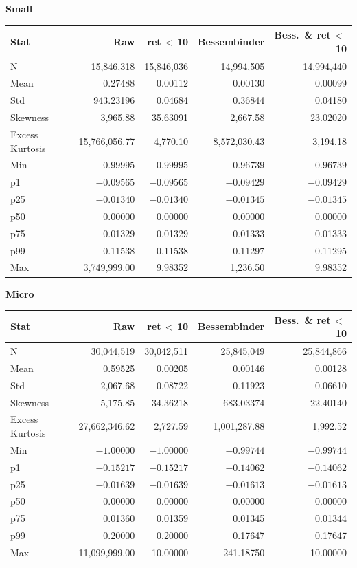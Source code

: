 \documentclass[10pt]{article}
\begin{document}
\begin{center}
\vspace{1.1em}
\textbf{Small}\\[2pt]
\begin{tabular}{l r r r r}
\toprule
Stat & {Raw} & {ret\,$<$\,10} & {Bessembinder} & {Bess.\ \& ret\,$<$\,10} \\
\midrule
N & 15,846,318 & 15,846,036 & 14,994,505 & 14,994,440 \\
Mean & 0.27488 & 0.00112 & 0.00130 & 0.00099 \\
Std & 943.23196 & 0.04684 & 0.36844 & 0.04180 \\
Skewness & 3,965.88 & 35.63091 & 2,667.58 & 23.02020 \\
Excess Kurtosis & 15,766,056.77 & 4,770.10 & 8,572,030.43 & 3,194.18 \\
Min & $-0.99995$ & $-0.99995$ & $-0.96739$ & $-0.96739$ \\
p1 & $-0.09565$ & $-0.09565$ & $-0.09429$ & $-0.09429$ \\
p25 & $-0.01340$ & $-0.01340$ & $-0.01345$ & $-0.01345$ \\
p50 & 0.00000 & 0.00000 & 0.00000 & 0.00000 \\
p75 & 0.01329 & 0.01329 & 0.01333 & 0.01333 \\
p99 & 0.11538 & 0.11538 & 0.11297 & 0.11295 \\
Max & 3,749,999.00 & 9.98352 & 1,236.50 & 9.98352 \\
\bottomrule
\end{tabular}

\vspace{1.1em}
\textbf{Micro}\\[2pt]
\begin{tabular}{l r r r r}
\toprule
Stat & {Raw} & {ret\,$<$\,10} & {Bessembinder} & {Bess.\ \& ret\,$<$\,10} \\
\midrule
N & 30,044,519 & 30,042,511 & 25,845,049 & 25,844,866 \\
Mean & 0.59525 & 0.00205 & 0.00146 & 0.00128 \\
Std & 2,067.68 & 0.08722 & 0.11923 & 0.06610 \\
Skewness & 5,175.85 & 34.36218 & 683.03374 & 22.40140 \\
Excess Kurtosis & 27,662,346.62 & 2,727.59 & 1,001,287.88 & 1,992.52 \\
Min & $-1.00000$ & $-1.00000$ & $-0.99744$ & $-0.99744$ \\
p1 & $-0.15217$ & $-0.15217$ & $-0.14062$ & $-0.14062$ \\
p25 & $-0.01639$ & $-0.01639$ & $-0.01613$ & $-0.01613$ \\
p50 & 0.00000 & 0.00000 & 0.00000 & 0.00000 \\
p75 & 0.01360 & 0.01359 & 0.01345 & 0.01344 \\
p99 & 0.20000 & 0.20000 & 0.17647 & 0.17647 \\
Max & 11,099,999.00 & 10.00000 & 241.18750 & 10.00000 \\
\bottomrule
\end{tabular}


\end{center}
\end{document}
